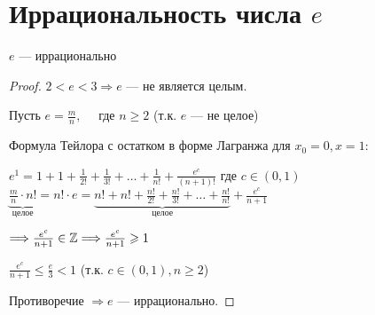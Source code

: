 \section{Иррациональность числа $e$}

\begin{theorem-non}
    $e$ --- иррационально    

    \begin{proof}
        $2 < e < 3 \Longrightarrow e$ --- не является целым.
        
        Пусть $e = \frac{m}{n}, \quad$ где $n \geqslant 2$ (т.к. $e$ --- не целое)
        
        Формула Тейлора с остатком в форме Лагранжа для $x_0 = 0, x = 1:$
        \begin{center}
            $e^1 = 1 + 1 + \frac{1}{2!} + \frac{1}{3!} + \dots + \frac{1}{n!} + \frac{e^c}{(n+1)!}$ где $c \in (0,1)$ \\
            $\underbrace{\frac{m}{n} \cdot n!}_{\text{целое}} = n! \cdot e = 
            \underbrace{n! + n! + \frac{n!}{2!} + \frac{n!}{3!} + \dots + \frac{n!}{n!}}_{\text{целое}} + \frac{e^c}{n+1}$

            $\Longrightarrow \frac{e^c}{n+1} \in \mathbb{Z} \Longrightarrow \frac{e^c}{n+1} \geqslant 1$ 

            $\frac{e^c}{n + 1} \leqslant \frac{e}{3} < 1$ (т.к. $c \in (0,1), n \geqslant 2$) 
        \end{center}
        Противоречие $\Longrightarrow e$ --- иррационально. 

    \end{proof}

\end{theorem-non}